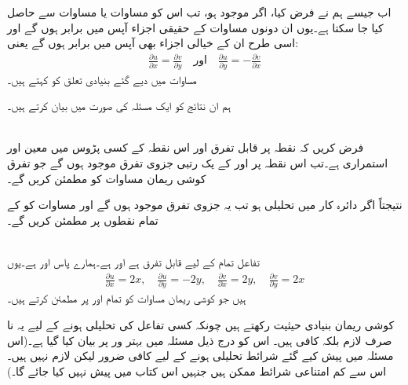 اب جیسے ہم نے فرض کیا، اگر  موجود ہو، تب اس کو  مساوات  یا مساوات 
 سے حاصل کیا جا سکتا ہے۔یوں ان دونوں مساوات کے حقیقی اجزاء  آپس میں برابر ہوں گے اور اسی طرح ان کے خیالی اجزاء بھی آپس میں برابر ہوں گے یعنی:
\begin{align} \label{مساوات_مخلوط_کوشی_ریمان}
\frac{\partial u}{\partial x}=\frac{\partial v}{\partial y}\quad \text{اور}\quad \frac{\partial u}{\partial y}=-\frac{\partial v}{\partial x}
\end{align}
مساوات  میں دیے گئے بنیادی  تعلق کو  کہتے ہیں۔

ہم ان نتائج کو ایک مسئلہ کی صورت میں بیان کرتے ہیں۔

\quad {}\\
فرض کریں کہ  نقطہ  پر قابل تفرق اور اس نقطہ کے کسی پڑوس میں معین اور استمراری ہے۔تب اس نقطہ پر  اور  کے یک رتبی جزوی تفرق موجود ہوں گے  جو تفرق کوشی ریمان مساوات  کو مطمئن کریں گے۔ 

نتیجتاً اگر دائرہ کار  میں  تحلیلی ہو تب یہ جزوی تفرق موجود ہوں گے اور مساوات  کو  کے تمام نقطوں پر مطمئن کریں گے۔

\quad {}\\
تفاعل  تمام  کے لیے قابل تفرق ہے اور  ہے۔ہمارے پاس  اور  ہے۔یوں
\begin{align*}
\frac{\partial u}{\partial x}=2x,\quad \frac{\partial u}{\partial y}=-2y,\quad \frac{\partial v}{\partial x}=2y,\quad \frac{\partial v}{\partial y}=2x
\end{align*}
ہیں جو کوشی ریمان مساوات  کو تمام  اور  پر مطمئن کرتے ہیں۔

کوشی ریمان بنیادی حیثیت رکھتے ہیں چونکہ کسی تفاعل کی تحلیلی ہونے کے لیے  یہ نا صرف لازم بلکہ کافی ہیں۔ اس کو درج ذیل مسئلہ میں بہتر ور پر بیان کیا گیا ہے۔(اس مسئلہ میں پیش کیے گئے شرائط تحلیلی ہونے کے لیے کافی ضرور لیکن لازم نہیں ہیں۔اس سے کم امتناعی شرائط ممکن ہیں جنہیں اس کتاب میں پیش نہیں کیا جائے گا۔)

